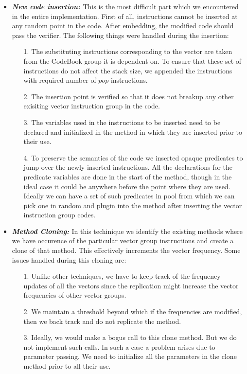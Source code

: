 \begin{itemize}
   \item {\bf {\em New code insertion: }} This is the most difficult part which we 
         encountered in the entire implementation. First of all, instructions cannot be
	 inserted at any random point in the code. After embedding, the modified
	 code should pass the verifier. The following things were handled during
	 the insertion:
	 \begin{itemize}
	 \item [1.] The substituting instructions corresponding to the vector are
	       taken from the CodeBook group it is dependent on. To ensure that
	       these set of instructions do not affect the stack size, we 
	       appended the instructions with required number of $pop$ 
	       instructions.
         \item [2.] The insertion point is verified so that it does not breakup any 
	       other exisiting vector instruction group in the code.
	 \item [3.] The variables used in the instructions to be inserted need
	       to be declared and initialized in the method in which they are
	       inserted prior to their use.
         \item [4.] To preserve the semantics of the code we inserted opaque
	       predicates to jump over the newly inserted instructions. All the
	       declarations for the predicate variables are done in the start
	       of the method, though in the ideal case it could be anywhere before 
	       the point where they are used. Ideally we can have a set of such
	       predicates in pool from which we can pick one in random and 
	       plugin into the method after inserting the vector instruction
	       group codes.
	 \end{itemize}
   \item {\bf {\em Method Cloning: }}In this techinique we identify the existing methods 
         where we have occurence of the particular vector group instructions and
	 create a clone of that method. This effectively increments the vector 
	 frequency. Some issues handled during this cloning are:
	 \begin{itemize}
         \item [1.] Unlike other techniques, we have to keep track of the frequency
	       updates of all the vectors since the replication might increase the
	       vector frequencies of other vector groups.
	 \item [2.] We maintain a threshold beyond which if the frequencies are
	       modified, then we back track and do not replicate the method.
         \item [3.] Ideally, we would make a bogus call to this clone method. But we
	       do not implement such calls. In such a case a problem arises due to 
	       parameter passing. We need to initialize all the parameters in the 
	       clone method prior to all their use.
	 \end{itemize}

\end{itemize} 


